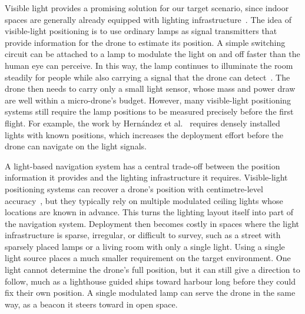 Visible light provides a promising solution for our target scenario, since indoor spaces are generally already equipped with lighting infrastructure~\cite{zhuang2018vlp}. The idea of visible-light positioning is to use ordinary lamps as signal transmitters that provide information for the drone to estimate its position. A simple switching circuit can be attached to a lamp to modulate the light on and off faster than the human eye can perceive. In this way, the lamp continues to illuminate the room steadily for people while also carrying a signal that the drone can detect~\cite{pathak2015vlc}. The drone then needs to carry only a small light sensor, whose mass and power draw are well within a micro-drone's budget. However, many visible-light positioning systems still require the lamp positions to be measured precisely before the first flight. For example, the work by Hernández et al.~\cite{firefly2023vlc} requires densely installed lights with known positions, which increases the deployment effort before the drone can navigate on the light signals.

A light-based navigation system has a central trade-off between the position information it provides and the lighting infrastructure it requires. Visible-light positioning systems can recover a drone's position with centimetre-level accuracy~\cite{kuo2014luxapose}, but they typically rely on multiple modulated ceiling lights whose locations are known in advance. This turns the lighting layout itself into part of the navigation system. Deployment then becomes costly in spaces where the light infrastructure is sparse, irregular, or difficult to survey, such as a street with sparsely placed lamps or a living room with only a single light. Using a single light source places a much smaller requirement on the target environment. One light cannot determine the drone's full position, but it can still give a direction to follow, much as a lighthouse guided ships toward harbour long before they could fix their own position. A single modulated lamp can serve the drone in the same way, as a beacon it steers toward in open space.

